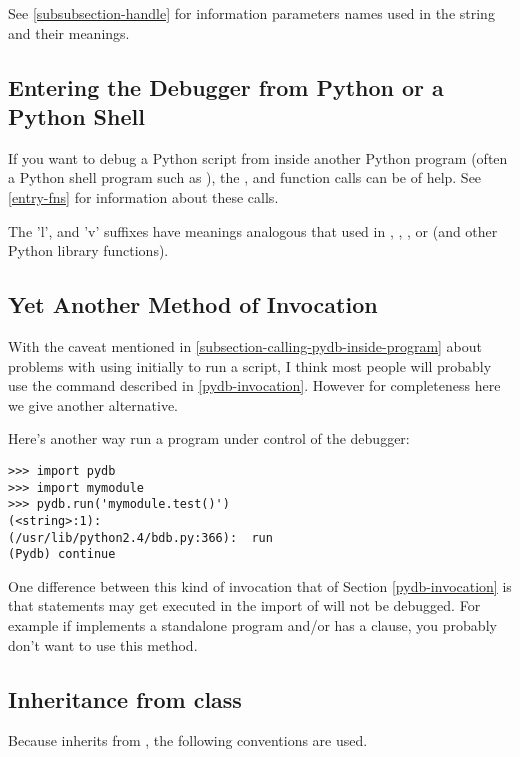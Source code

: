 See \ref{subsubsection-handle} for information parameters names used
in the string and their meanings.

\subsection{Entering the Debugger from Python or a Python
  Shell}\label{subsection-entering-pydb-from-python}

If you want to debug a Python script from inside another Python
program (often a Python shell program such as
), the 
, and  function calls can be of help. See
\ref{entry-fns} for information about these calls. 

The 'l', and 'v' suffixes have meanings analogous that used in
, , , or
 (and other Python library functions).

\subsection{Yet Another Method of Invocation}

With the caveat mentioned in
\ref{subsection-calling-pydb-inside-program} about problems with using
 initially to run a script, I think most people will
probably use the  command described in
\ref{pydb-invocation}. However for completeness here we give another
alternative.

Here's another way run a program under control of the debugger:

\begin{verbatim}
>>> import pydb
>>> import mymodule
>>> pydb.run('mymodule.test()')
(<string>:1): 
(/usr/lib/python2.4/bdb.py:366):  run
(Pydb) continue
\end{verbatim}

One difference between this kind of invocation that of Section
\ref{pydb-invocation} is that statements may get executed in the
import of  will not be debugged. For example if
 implements a standalone program and/or has a
 clause, you probably don't want to use
this method.


\subsection{Inheritance from class }
Because  inherits from , the following
conventions are used. 


